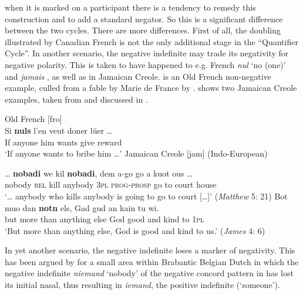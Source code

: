 ﻿\documentclass[output=paper,draft,draftmode,colorlinks,citecolor=brown]{langscibook}
\begin{document}
when it is marked on a participant there is a tendency to remedy this
construction and to add a standard negator. So this is a significant
difference between the two cycles. There are more differences. First of
all, the doubling illustrated by Canadian French is not the only
additional stage in the ``Quantifier Cycle''. In another scenario, the
negative indefinite may trade its negativity for negative polarity. This is
taken to have happened to e.g. French \textit{nul} `no (one)'
\parencites(see)()[113--114]{Catalani2001}[135--137]{Buridant2000}[327]{AuweraAlsenoy2011}[211--213]{Gianollo2018a}
and \textit{jamais} \citep{MosegaardHansen2012}, as well as in Jamaican
Creole.   is an Old French non-negative
example, culled from a fable by Marie de France by
\citet[167]{Buridant2000}.   shows two
Jamaican Creole examples, taken from
\citet{DiTestament2012} and discussed in \citet{AuweraLisser2019}.
%
\begin{exe}\ex\label{ex:int-oldfrench-bribe}
Old French [fro] \\
    \gll Si  \textbf{nuls}    l'en  veut  doner  lüer \ldots \\
      If  anyone  him  wants  give  reward \\
    \glt `If anyone wants to bribe him \ldots'
\ex\label{ex:int-jamaicancr-kill}
   Jamaican Creole [jam] (Indo-European)
   \begin{xlist}
   \ex\label{ex:int-jamaicancr-kill-a}
   \gll \ob\ldots{\cb} \textbf{nobadi} we kil \textbf{nobadi}, dem a-go
   go a kuot ous \ob\ldots{\cb} \\
  {} nobody \textsc{rel} kill anybody \textsc{3pl}
  \textsc{prog}-\textsc{prosp} go to  court  house \\
    \glt `\ldots{} anybody who kills anybody is going to go to court
    [\ldots]' (\textit{Matthew} 5: 21)
    \ex\gll Bot muo dan \textbf{notn} els, Gad gud an kain tu wi.\\ 
    but more than anything else God good and kind to \textsc{1pl}\\
    \glt `But more than anything else, God is good and kind to us.'
    (\textit{James} 4: 6)
    \end{xlist}\end{exe}
%
In yet another scenario, the negative indefinite loses a marker of
negativity. This has been argued by \citet{AuweraCuypere2006} for a
small area within Brabantic Belgian Dutch in which the negative indefinite
\textit{niemand} `nobody' of the negative concord pattern in
 has lost its initial nasal, thus resulting in
\textit{iemand}, the positive indefinite (`someone').
\end{document}
